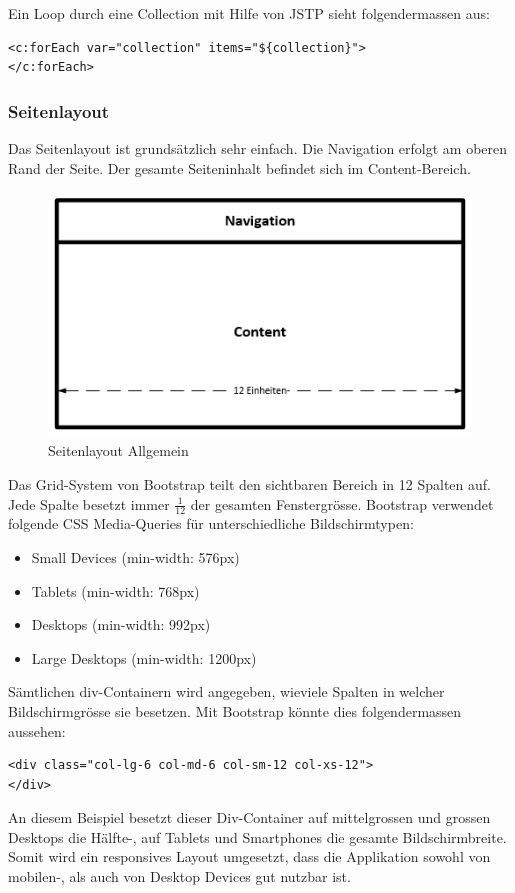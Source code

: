 Ein Loop durch eine Collection mit Hilfe von JSTP sieht folgendermassen aus:
\begin{lstlisting}[language=html5]
<c:forEach var="collection" items="${collection}">
</c:forEach>
\end{lstlisting}

\subsubsection{Seitenlayout}
Das Seitenlayout ist grundsätzlich sehr einfach. Die Navigation erfolgt am oberen Rand der Seite. Der gesamte Seiteninhalt befindet sich im Content-Bereich. 
\begin{figure}[H]
\centering
\includegraphics[scale=0.9]{../04_Realisierung/images/userinterface/seitenlayout_allgemein_large.png}
\caption{Seitenlayout Allgemein}
\end{figure}
Das Grid-System von Bootstrap teilt den sichtbaren Bereich in 12 Spalten auf. Jede Spalte besetzt immer $\frac{1}{12}$ der gesamten Fenstergrösse. Bootstrap verwendet folgende CSS Media-Queries für unterschiedliche Bildschirmtypen:
\begin{itemize}
\item Small Devices (min-width: 576px)
\item Tablets (min-width: 768px)
\item Desktops (min-width: 992px)
\item Large Desktops (min-width: 1200px)
\end{itemize}
Sämtlichen div-Containern wird angegeben, wieviele Spalten in welcher Bildschirmgrösse sie besetzen. Mit Bootstrap könnte dies folgendermassen aussehen: 
\begin{lstlisting}[language=html5]
<div class="col-lg-6 col-md-6 col-sm-12 col-xs-12">
</div>
\end{lstlisting}
An diesem Beispiel besetzt dieser Div-Container auf mittelgrossen und grossen Desktops die Hälfte-, auf Tablets und Smartphones die gesamte Bildschirmbreite. Somit wird ein responsives Layout umgesetzt, dass die Applikation sowohl von mobilen-, als auch von Desktop Devices gut nutzbar ist.

